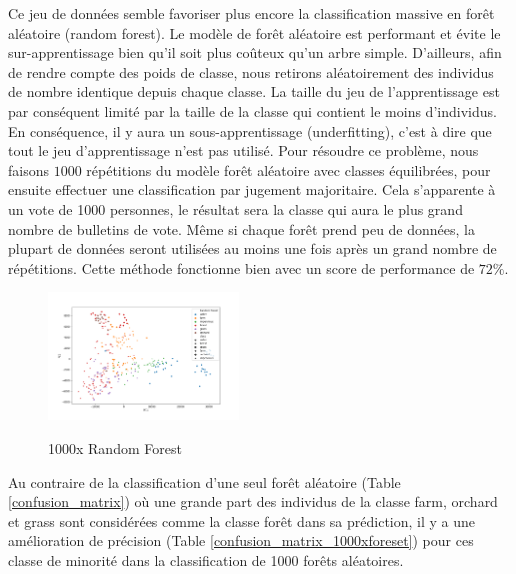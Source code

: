 \documentclass[twocolumn,10pt]{article}
\begin{document}
Ce jeu de données semble favoriser plus encore la classification massive en forêt aléatoire (random forest). Le modèle de forêt aléatoire est performant et évite le sur-apprentissage bien qu'il soit plus coûteux qu'un arbre simple. D'ailleurs, afin de rendre compte des poids de classe, nous retirons aléatoirement des individus de nombre identique depuis chaque classe. La taille du jeu de l'apprentissage est par conséquent limité par la taille de la classe qui contient le moins d'individus. En conséquence, il y aura un sous-apprentissage (underfitting), c'est à dire que tout le jeu d'apprentissage n'est pas utilisé. Pour résoudre ce problème, nous faisons $ 1000 $ répétitions du modèle forêt aléatoire avec classes équilibrées, pour ensuite effectuer une classification par jugement majoritaire. Cela s'apparente à un vote de 1000 personnes, le résultat sera la classe qui aura le plus grand nombre de bulletins de vote. Même si chaque forêt prend peu de données, la plupart de données seront utilisées au moins une fois après un grand nombre de répétitions. Cette méthode fonctionne bien avec un score de performance de $ 72\% $.

\begin{figure}[htbp]
	\begin{center}
		\label{fig:randomforest}
		\includegraphics[width=0.45\textwidth]{figures/Tree/randomforest_repetition.png}
		\caption{1000x Random Forest}
	\end{center}
\end{figure}

Au contraire de la classification d'une seul forêt aléatoire (Table \ref{confusion_matrix}) où une grande part des individus de la classe farm, orchard et grass sont considérées comme la classe forêt dans sa prédiction, il y a une amélioration de précision (Table \ref{confusion_matrix_1000xforeset}) pour ces classe de minorité dans la classification de 1000 forêts aléatoires.
\end{document}
